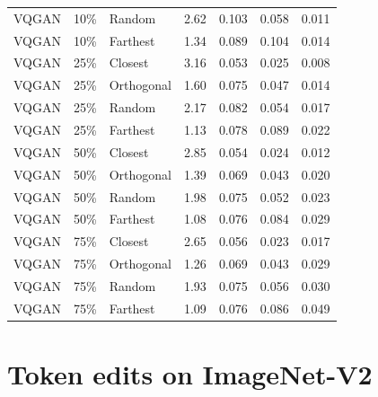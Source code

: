 \begin{longtable}{lllrrrr}
VQGAN & 10\% & Random & 2.62 & 0.103 & 0.058 & 0.011 \\
VQGAN & 10\% & Farthest & 1.34 & 0.089 & 0.104 & 0.014 \\
VQGAN & 25\% & Closest & 3.16 & 0.053 & 0.025 & 0.008 \\
VQGAN & 25\% & Orthogonal & 1.60 & 0.075 & 0.047 & 0.014 \\
VQGAN & 25\% & Random & 2.17 & 0.082 & 0.054 & 0.017 \\
VQGAN & 25\% & Farthest & 1.13 & 0.078 & 0.089 & 0.022 \\
VQGAN & 50\% & Closest & 2.85 & 0.054 & 0.024 & 0.012 \\
VQGAN & 50\% & Orthogonal & 1.39 & 0.069 & 0.043 & 0.020 \\
VQGAN & 50\% & Random & 1.98 & 0.075 & 0.052 & 0.023 \\
VQGAN & 50\% & Farthest & 1.08 & 0.076 & 0.084 & 0.029 \\
VQGAN & 75\% & Closest & 2.65 & 0.056 & 0.023 & 0.017 \\
VQGAN & 75\% & Orthogonal & 1.26 & 0.069 & 0.043 & 0.029 \\
VQGAN & 75\% & Random & 1.93 & 0.075 & 0.056 & 0.030 \\
VQGAN & 75\% & Farthest & 1.09 & 0.076 & 0.086 & 0.049 \\
\end{longtable}
\endgroup

\section{Token edits on ImageNet-V2}

